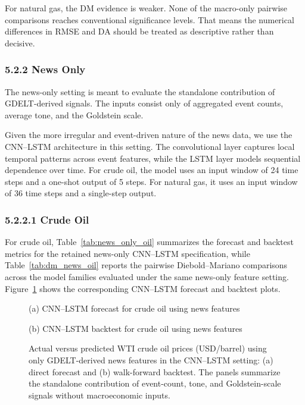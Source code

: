 \documentclass[pdflatex,sn-mathphys-num]{sn-jnl}%
\theoremstyle{thmstyleone}%
\theoremstyle{thmstyletwo}%
\theoremstyle{thmstylethree}%
\begin{document}
For natural gas, the DM evidence is weaker. None of the macro-only pairwise comparisons reaches conventional significance levels. That means the numerical differences in RMSE and DA should be treated as descriptive rather than decisive.

\subsubsection*{5.2.2 News Only}

The news-only setting is meant to evaluate the standalone contribution of GDELT-derived signals. The inputs consist only of aggregated event counts, average tone, and the Goldstein scale.

Given the more irregular and event-driven nature of the news data, we use the CNN--LSTM architecture in this setting. The convolutional layer captures local temporal patterns across event features, while the LSTM layer models sequential dependence over time. For crude oil, the model uses an input window of 24 time steps and a one-shot output of 5 steps. For natural gas, it uses an input window of 36 time steps and a single-step output.

\subsubsection*{5.2.2.1 Crude Oil}
For crude oil, Table~\ref{tab:news_only_oil} summarizes the forecast and backtest metrics for the retained news-only CNN--LSTM specification, while Table~\ref{tab:dm_news_oil} reports the pairwise Diebold--Mariano comparisons across the model families evaluated under the same news-only feature setting. Figure~\ref{fig:news_only_oil_plots} shows the corresponding CNN--LSTM forecast and backtest plots.

\begin{figure}[h]
\centering
\begin{minipage}[t]{0.495\textwidth}
\centering

\small (a) CNN--LSTM forecast for crude oil using news features
\end{minipage}\hfill
\begin{minipage}[t]{0.495\textwidth}
\centering

\small (b) CNN--LSTM backtest for crude oil using news features
\end{minipage}
\caption{Actual versus predicted WTI crude oil prices (USD/barrel) using only GDELT-derived news features in the CNN--LSTM setting: (a) direct forecast and (b) walk-forward backtest. The panels summarize the standalone contribution of event-count, tone, and Goldstein-scale signals without macroeconomic inputs.}
\label{fig:news_only_oil_plots}
\end{figure}
\end{document}

